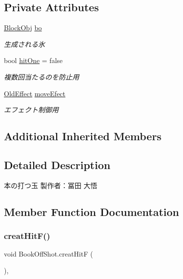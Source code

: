 \subsection*{Private Attributes}
\begin{DoxyCompactItemize}
\item 
\hyperlink{class_block_obj}{Block\+Obj} \hyperlink{class_book_off_shot_a3f8835ad56886b487a7e715d259f2a8b}{bo}
\begin{DoxyCompactList}\small\item\em 生成される氷 \end{DoxyCompactList}\item 
bool \hyperlink{class_book_off_shot_a8695155f87608914acc2e9d78e7dbe94}{hit\+One} = false
\begin{DoxyCompactList}\small\item\em 複数回当たるのを防止用 \end{DoxyCompactList}\item 
\hyperlink{class_old_effect}{Old\+Effect} \hyperlink{class_book_off_shot_a5c4c0131ce9a83508127527d612ca874}{move\+Efect}
\begin{DoxyCompactList}\small\item\em エフェクト制御用 \end{DoxyCompactList}\end{DoxyCompactItemize}
\subsection*{Additional Inherited Members}


\subsection{Detailed Description}
本の打つ玉 製作者：冨田 大悟 



\subsection{Member Function Documentation}
\mbox{\label{class_book_off_shot_a1a8d24f8aef2d2cf7c204a7d03ba7c86}} 
\subsubsection{\texorpdfstring{creat\+Hit\+F()}{creatHitF()}}
{\footnotesize\ttfamily void Book\+Off\+Shot.\+creat\+HitF (\begin{DoxyParamCaption}{ }\end{DoxyParamCaption})\hspace{0.3cm}{\ttfamily [inline]}, {\ttfamily [private]}}



